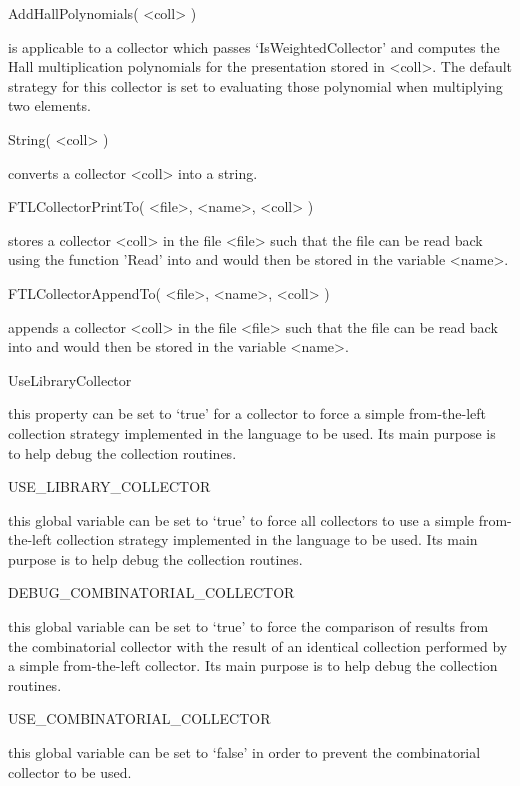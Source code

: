 \>AddHallPolynomials( <coll> )

is applicable  to a  collector which passes  `IsWeightedCollector' and
computes  the  Hall multiplication  polynomials  for the  presentation
stored in <coll>.   The default strategy for this  collector is set to
evaluating those polynomial when multiplying two elements.

\>String( <coll> )

converts a collector <coll> into a string.

\>FTLCollectorPrintTo( <file>, <name>, <coll> )

stores a collector <coll> in the file <file> such that the file can be
read back using the function 'Read' into {\GAP} and would then be stored 
in the variable <name>.

\>FTLCollectorAppendTo( <file>, <name>, <coll> )

appends a collector  <coll> in the file <file> such  that the file can
be read  back into  {\GAP} and  would then be  stored in  the variable
<name>.

\>UseLibraryCollector

this property can  be set to `true' for a collector  to force a simple
from-the-left collection  strategy implemented in  the {\GAP} language
to  be  used.   Its main  purpose  is  to  help debug  the  collection
routines.

\>USE_LIBRARY_COLLECTOR

this global variable  can be set to `true' to  force all collectors to
use  a simple  from-the-left  collection strategy  implemented in  the
{\GAP} language  to be used.   Its main purpose  is to help  debug the
collection routines.

\>DEBUG_COMBINATORIAL_COLLECTOR

this  global variable can  be set  to `true' to force the  comparison of
results  from  the  combinatorial  collector  with the  result  of  an
identical collection  performed by  a simple from-the-left  collector. 
Its main purpose is to help debug the collection routines.

\>USE_COMBINATORIAL_COLLECTOR

this global  variable can be  set to `false'  in order to  prevent the
combinatorial collector to be used.

